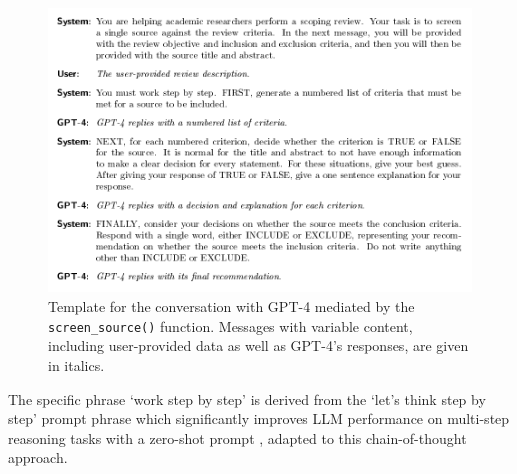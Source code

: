 \documentclass[10pt,a4paper,twocolumn]{article}
\begin{document}
\begin{figure}
\centering
  \includegraphics[width=\textwidth]{./fig_1.pdf}
  \caption{Template for the conversation with GPT-4 mediated by the \texttt{screen\_source()} function. Messages with variable content, including user-provided data as well as GPT-4's responses, are given in italics.}
  \label{fig:conversation_template}
\end{figure}

The specific phrase `work step by step' is derived from the `let's think step by step' prompt phrase which significantly improves LLM performance on multi-step reasoning tasks with a zero-shot prompt \cite{Kojima.2022}, adapted to this chain-of-thought approach.
\end{document}
